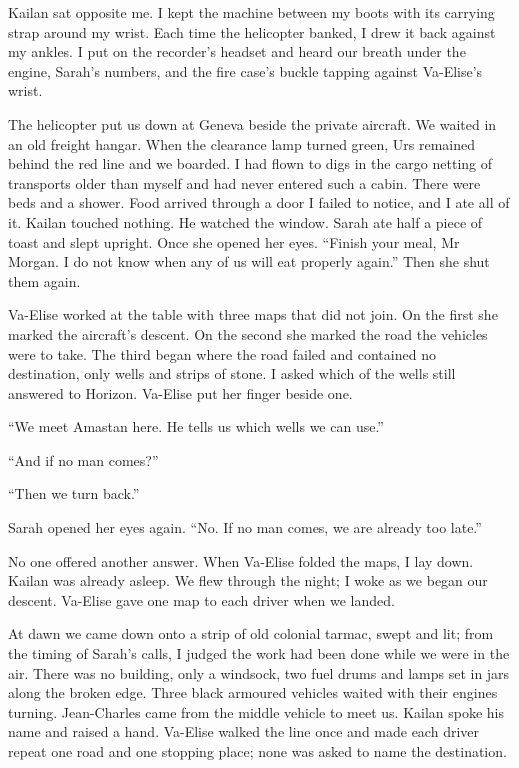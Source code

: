 Kailan sat opposite me. I kept the machine between my boots with its carrying strap around my wrist. Each time the helicopter banked, I drew it back against my ankles. I put on the recorder's headset and heard our breath under the engine, Sarah's numbers, and the fire case's buckle tapping against Va-Elise's wrist.\par

The helicopter put us down at Geneva beside the private aircraft. We waited in an old freight hangar. When the clearance lamp turned green, Urs remained behind the red line and we boarded. I had flown to digs in the cargo netting of transports older than myself and had never entered such a cabin. There were beds and a shower. Food arrived through a door I failed to notice, and I ate all of it. Kailan touched nothing. He watched the window. Sarah ate half a piece of toast and slept upright. Once she opened her eyes. ``Finish your meal, Mr Morgan. I do not know when any of us will eat properly again.'' Then she shut them again.\par

Va-Elise worked at the table with three maps that did not join. On the first she marked the aircraft's descent. On the second she marked the road the vehicles were to take. The third began where the road failed and contained no destination, only wells and strips of stone. I asked which of the wells still answered to Horizon. Va-Elise put her finger beside one.\par

``We meet Amastan here. He tells us which wells we can use.''\par

``And if no man comes?''\par

``Then we turn back.''\par

Sarah opened her eyes again. ``No. If no man comes, we are already too late.''\par

No one offered another answer. When Va-Elise folded the maps, I lay down. Kailan was already asleep. We flew through the night; I woke as we began our descent. Va-Elise gave one map to each driver when we landed.\par

\ornament

At dawn we came down onto a strip of old colonial tarmac, swept and lit; from the timing of Sarah's calls, I judged the work had been done while we were in the air. There was no building, only a windsock, two fuel drums and lamps set in jars along the broken edge. Three black armoured vehicles waited with their engines turning. Jean-Charles came from the middle vehicle to meet us. Kailan spoke his name and raised a hand. Va-Elise walked the line once and made each driver repeat one road and one stopping place; none was asked to name the destination.\par

